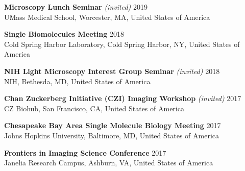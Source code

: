 \documentclass[margin,line]{res}
\begin{document}
\begin{resume}
\vspace*{-3mm}
{\bf Microscopy Lunch Seminar} {\it (invited)}  \hfill 2019\\
UMass Medical School, Worcester, MA, United States of America%

\vspace*{-3mm}
{\bf Single Biomolecules Meeting}   \hfill 2018\\
Cold Spring Harbor Laboratory, Cold Spring Harbor, NY, United States of America %

\vspace*{-3mm}
{\bf NIH Light Microscopy Interest Group Seminar} {\it (invited)}   \hfill 2018\\
 NIH, Bethesda, MD, United States of America %

\vspace*{-3mm}
{\bf Chan Zuckerberg Initiative (CZI) Imaging Workshop} {\it (invited)}  \hfill 2017\\
 CZ Biohub, San Francisco, CA, United States of America%

\vspace*{-3mm}
{\bf Chesapeake Bay Area Single Molecule Biology Meeting} \hfill 2017\\
Johns Hopkins University, Baltimore, MD, United States of America%

\vspace*{-3mm}
{\bf Frontiers in Imaging Science Conference} \hfill 2017\\
Janelia Research Campus, Ashburn, VA, United States of America %


\end{resume}
\end{document}
